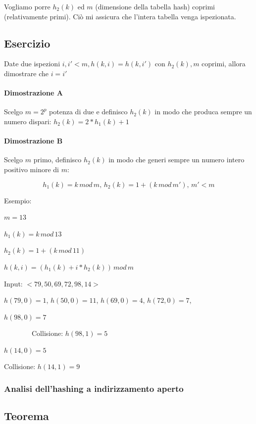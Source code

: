 \documentclass[11pt,a4paper,twoside,openright]{book}
\let\oldparagraph\paragraph
\renewcommand{\paragraph}[1]{\oldparagraph{#1}\mbox{}}
\begin{document}
{Vogliamo porre $h_2(k)$ ed $m$ (dimensione della tabella hash) coprimi (relativamente primi). Ciò mi assicura che l'intera tabella venga ispezionata.}

\subsection{Esercizio}

{Date due ispezioni $i,i' < m, h(k,i) = h(k,i')$ con $h_2(k),m$ coprimi, allora dimostrare che $i=i'$}

\paragraph{Dimostrazione A}

{Scelgo $m=2^p$ potenza di due e definisco $h_2(k)$ in modo che produca sempre un numero dispari: $h_2(k) = 2*h_1(k)+1$}

\paragraph{Dimostrazione B}

{Scelgo $m$ primo, definisco $h_2(k)$ in modo che generi sempre un numero intero positivo minore di $m$:}

\begin{equation}
h_1(k)=k\,mod\,m,\,h_2(k)=1+(k\,mod\,m'),\,m' < m
\end{equation}

{Esempio:}

$m=13$

$h_1(k)=k\,mod\,13$

$h_2(k)=1 + (k\,mod\,11)$

$h(k,i) = (h_1(k) + i * h_2(k))\,mod\,m$

{Input: $<79,50,69,72,98,14>$}

$h(79,0)=1$, $h(50,0)=11$, $h(69,0)=4$, $h(72,0)=7$, 

$h(98,0)=7$

{~~~~~~~~Collisione: $h(98,1) = 5$}

$h(14,0)=5$

{Collisione: $h(14,1) = 9$}

\subsubsection{Analisi dell'hashing a indirizzamento aperto}

\subsection{Teorema}
\end{document}
